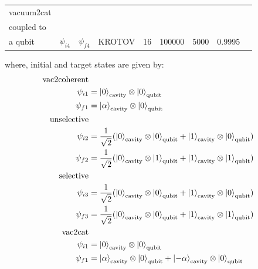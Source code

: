 \documentclass[12pt]{report}
\begin{document}
\begin{table}
\begin{tabularx}{\textheight}{|p{4cm}|p{2cm}|X|X|p{2cm}|X|X|X|X|}
    vacuum2cat                            & \begin{tabular}[c]{@{}l@{}}cavity\\ coupled to\\ a qubit\end{tabular} & $\psi_{i4}$                                                        & $\psi_{f4}$                                                        & KROTOV                                              & 16    & 100000                                                         & 5000                                                   & 0.9995                                                                       \\ \hline
    \end{tabularx}
\end{table}

where, initial and target states are given by: 
\begin{align*}
    \text{vac2coherent} \\
    \psi_{i1} &= \ket{0}_{\text{cavity}} \otimes \ket{0}_{\text{qubit}} \\
    \psi_{f1} &= \ket{\alpha}_{\text{cavity}} \otimes \ket{0}_{\text{qubit}} \\
    \text{unselective} \\
    \psi_{i2} &= \frac{1}{\sqrt{2}} (\ket{0}_{\text{cavity}} \otimes \ket{0}_{\text{qubit}} 
                + \ket{1}_{\text{cavity}} \otimes \ket{0}_{\text{qubit}})\\
    \psi_{f2} &= \frac{1}{\sqrt{2}} (\ket{0}_{\text{cavity}} \otimes \ket{1}_{\text{qubit}} 
                + \ket{1}_{\text{cavity}} \otimes \ket{1}_{\text{qubit}})\\
    \text{selective} \\
    \psi_{i3} &= \frac{1}{\sqrt{2}} (\ket{0}_{\text{cavity}} \otimes \ket{0}_{\text{qubit}} 
                + \ket{1}_{\text{cavity}} \otimes \ket{0}_{\text{qubit}})\\
    \psi_{f3} &= \frac{1}{\sqrt{2}} (\ket{0}_{\text{cavity}} \otimes \ket{0}_{\text{qubit}} 
                + \ket{1}_{\text{cavity}} \otimes \ket{1}_{\text{qubit}})\\
    \text{vac2cat} \\
    \psi_{i1} &= \ket{0}_{\text{cavity}} \otimes \ket{0}_{\text{qubit}} \\
    \psi_{f1} &= \ket{\alpha}_{\text{cavity}} \otimes \ket{0}_{\text{qubit}} 
                + \ket{-\alpha}_{\text{cavity}} \otimes \ket{0}_{\text{qubit}} \\
\end{align*}
\end{document}
